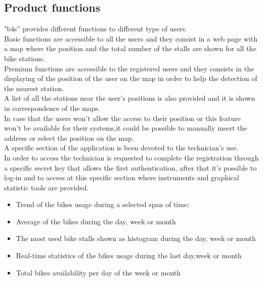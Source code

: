 \documentclass{article}
\begin{document}
\subsection{Product functions}
"b4s” provides different functions to different type of users.\\
Basic functions are accessible to all the users and they consist in a web page with a map where the position and the total number of the stalls are shown for all the bike stations.\\
Premium functions are accessible to the registered users and they consists in the displaying of the position of the user on the map in order to help the detection of the nearest station.\\
A list of all the stations near the user's positions is also provided and it is shown in correspondence of the maps.\\
In case that the users won’t allow the access to their position or this feature won't be available for their systems,it could be possible to manually insert the address or select the position on the map.\\
A specific section of the application is been devoted to the technician’s use.\\
In order to access the technician is requested to complete the registration through a specific secret key that allows the first authentication, after that it's possible to log-in and to access at this specific section where instruments and graphical statistic tools are provided. 
\begin{itemize}
    \item Trend of the bikes usage during a selected span of time;
    \item Average of the bikes during the day, week or month
    \item The most used bike stalls shown as histogram during the day, week or month
    \item Real-time statistics of the bikes usage during the last day,week or month
    \item Total bikes availability per day of the week or month
    
\end{itemize}
\end{document}
